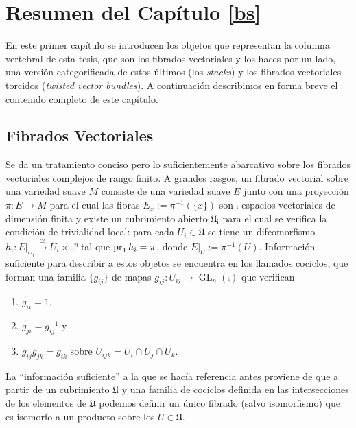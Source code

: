 \clearpage

{\small
\section{Resumen del Cap\'itulo \ref{bs}}

En este primer cap\'itulo se introducen los objetos que representan la columna vertebral de esta tesis, que son los fibrados vectoriales y los haces por un lado, una versi\'on categorificada de estos \'ultimos (los \emph{stacks}) y los fibrados vectoriales torcidos (\emph{twisted vector bundles}). A continuaci\'on describimos en forma breve el contenido completo de este cap\'itulo.

\subsection{Fibrados Vectoriales}

Se da un tratamiento conciso pero lo suficientemente abarcativo sobre los fibrados vectoriales complejos de rango finito. A grandes rasgos, un fibrado vectorial sobre una variedad suave $M$ consiste de una variedad suave $E$ junto con una proyecci\'on $\pi :E\to M$ para el cual las fibras $E_x:=\pi^{-1}(\{x\})$ son $\comp$-espacios vectoriales de dimensi\'on finita y existe un cubrimiento abierto $\mathfrak{U_i}$ para el cual se verifica la condici\'on de trivialidad local: para cada $U_i\in \mathfrak{U}$ se tiene un difeomorfismo $h_i:E|_{U_i}\stackrel{\cong}{\longrightarrow}U_i\times \comp^n$tal que $\operatorname{pr}_1 h_i=\pi$, donde $E|_U:=\pi^{-1}(U)$.
 Informaci\'on suficiente para describir a estos objetos se encuentra en los llamados cociclos, que forman una familia $\{g_{ij}\}$ de mapas $g_{ij}:U_{ij}\to \operatorname{GL}_n(\comp )$ que verifican
\begin{enumerate}
\item $g_{ii}=1$,
\item $g_{ji}=g_{ij}^{-1}$ y
\item $g_{ij}g_{jk}=g_{ik}$ sobre $U_{ijk}=U_i\cap U_j\cap U_k$.
\end{enumerate}
La ``informaci\'on suficiente'' a la que se hac\'ia referencia antes proviene de que a partir de un cubrimiento $\mathfrak{U}$ y una familia de cociclos definida en las intersecciones de los elementos de $\mathfrak{U}$ podemos definir un \'unico fibrado (salvo isomorfismo) que es isomorfo a un producto sobre los $U\in \mathfrak{U}$.

}
